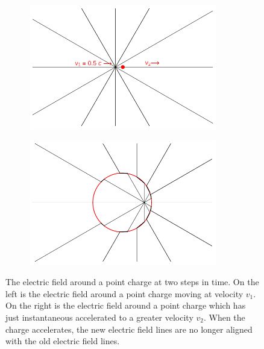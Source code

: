 \documentclass[12pt]{article}
\begin{document}
\begin{figure}[h]
    \begin{subfigure}{0.5\textwidth}
    \centering
    	\includegraphics[width=0.9\textwidth]{charge-moving-at-v1.png}
    \end{subfigure}
    \begin{subfigure}{0.5\textwidth}
    	\centering
    	\includegraphics[width=0.9\textwidth]{charge-moving-at-v2.png}
    \end{subfigure}
    \caption{\cite{wolframwave} The electric field around a point charge at two steps in time. On the left is the electric field around a point charge moving at velocity $v_1$. On the right is the electric field around a point charge which has just instantaneous accelerated to a greater velocity $v_2$. When the charge accelerates, the new electric field lines are no longer aligned with the old electric field lines. }
\end{figure} 
\end{document}
